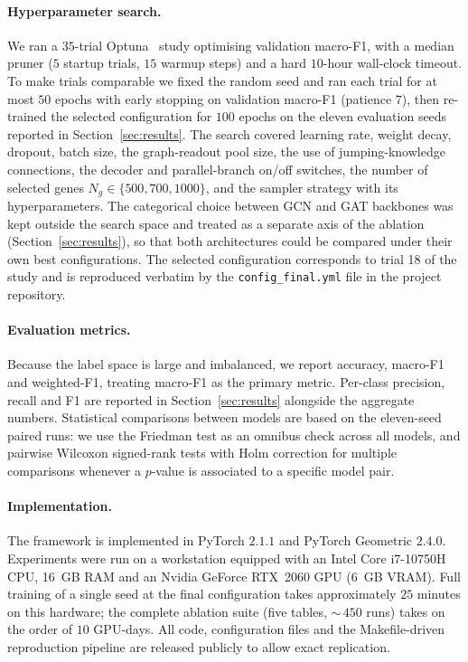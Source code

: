 \documentclass[review,3p,times,11pt, ]{elsarticle} %
\begin{document}
\paragraph{Hyperparameter search.}
We ran a $35$-trial Optuna~\cite{akiba2019optuna} study optimising
validation macro-F1, with a median pruner ($5$ startup trials, $15$
warmup steps) and a hard $10$-hour wall-clock timeout. To make trials
comparable we fixed the random seed and ran each trial for at most
$50$ epochs with early stopping on validation macro-F1 (patience
$7$), then re-trained the selected configuration for $100$ epochs on
the eleven evaluation seeds reported in
Section~\ref{sec:results}. The search covered learning rate, weight
decay, dropout, batch size, the graph-readout pool size, the use of
jumping-knowledge connections, the decoder and parallel-branch on/off
switches, the number of selected genes
$N_g \in \{500, 700, 1000\}$, and the sampler strategy with its
hyperparameters. The categorical choice between GCN and GAT backbones
was kept outside the search space and treated as a separate axis of
the ablation (Section~\ref{sec:results}), so that both architectures
could be compared under their own best configurations. The selected
configuration corresponds to trial 18 of the study and is reproduced
verbatim by the \texttt{config\_final.yml} file in the project
repository.

\paragraph{Evaluation metrics.}
Because the label space is large and imbalanced, we report accuracy,
macro-F1 and weighted-F1, treating macro-F1 as the primary metric.
Per-class precision, recall and F1 are reported in
Section~\ref{sec:results} alongside the aggregate numbers. Statistical
comparisons between models are based on the eleven-seed paired runs:
we use the Friedman test as an omnibus check across all models, and
pairwise Wilcoxon signed-rank tests with Holm correction for multiple
comparisons whenever a $p$-value is associated to a specific model
pair.

\paragraph{Implementation.}
The framework is implemented in PyTorch $2.1.1$ and PyTorch Geometric
$2.4.0$. Experiments were run on a workstation equipped with an
Intel Core i7-10750H CPU, 16~GB RAM and an Nvidia GeForce RTX~2060 GPU
(6~GB VRAM). Full training of a single seed at the final configuration
takes approximately $25$ minutes on this hardware; the complete
ablation suite (five tables, $\sim$\,$450$ runs) takes on the order of
$10$ GPU-days. All code, configuration files and the Makefile-driven
reproduction pipeline are released publicly to allow exact replication.
\end{document}
